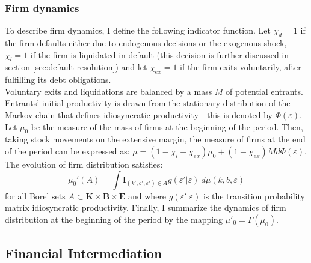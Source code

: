 \documentclass[12pt]{article}
\begin{document}
\subsubsection{Firm dynamics}
To describe firm dynamics, I define the following indicator function. Let $\chi_{d} = 1$ if the firm defaults either due to endogenous decisions or the exogenous shock, $\chi_l = 1$ if the firm is liquidated in default (this decision is further discussed in section \ref{sec:default resolution})  and let $\chi_{ex} = 1$ if the firm exits voluntarily, after fulfilling its debt obligations. \vspace{3mm} \\
Voluntary exits and liquidations are balanced by a mass $M$ of potential entrants. Entrants' initial productivity is drawn from the stationary distribution of the Markov chain that defines idiosyncratic productivity - this is denoted by $\Phi(\varepsilon)$. Let $\mu_0$ be the measure of the mass of firms at the beginning of the period. Then, taking stock movements on the extensive margin, the measure of firms at the end of the period can be expressed as: $\mu = (1 - \chi_l - \chi_{ex}) \mu_0  + (1 - \chi_{ex}) M d \Phi(\varepsilon) $. \vspace{3mm} \\
The evolution of firm distribution satisfies: 
\begin{equation} \label{eq_firmdim} 
    \mu_{0}'(A) = \int \mathbf{I}_{(k', b', \varepsilon') \in A} g(\varepsilon'|\varepsilon) \ d \mu (k,b,\varepsilon)
\end{equation}
for all Borel sets $A \subset  \mathbf{K} \times \mathbf{B} \times \mathbf{E} $ and where $g(\varepsilon'|\varepsilon)$ is the transition probability matrix idiosyncratic productivity. Finally, I summarize the dynamics of firm distribution at the beginning of the period by the mapping $ \mu'_0 =\Gamma(\mu_0)$.


\subsection{Financial Intermediation}  \label{sec: Financial Intermediation}
\end{document}

